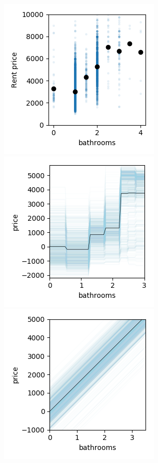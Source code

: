 \documentclass[12pt]{article}
\begin{document}
\begin{figure}[htbp]
\begin{center}
\includegraphics[scale=0.7]{images/bathrooms_vs_price.png}
\includegraphics[scale=0.7]{images/bathrooms_vs_price_pdp.png}\\
\includegraphics[scale=0.7]{images/bathrooms_vs_price_pdp_lm.png}

\end{center}
\end{figure}
\end{document}
